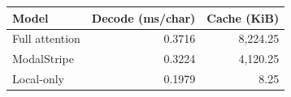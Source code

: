 \begin{tabular}{lrr}\toprule
Model & Decode (ms/char) & Cache (KiB)\\\midrule
Full attention & 0.3716 & 8,224.25 \\
ModalStripe & 0.3224 & 4,120.25 \\
Local-only & 0.1979 & 8.25 \\
\bottomrule\end{tabular}
